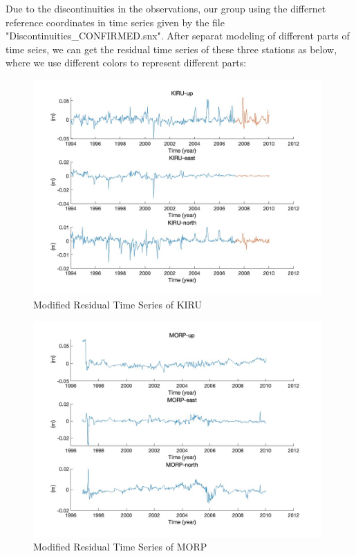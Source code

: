 \documentclass{article}
\begin{document}
Due to the discontinuities in the observations, our group using the differnet reference coordinates in time series given by the file "Discontinuities\_CONFIRMED.snx". 
After separat modeling of different parts of time seies, we can get the residual time series of these three stations as below, where we use different colors to represent different parts:
\begin{figure}[H]
  \centering
  \includegraphics[width=11cm]{../result/re_figure/fig_kiru/3.jpg}
  \captionsetup{skip=0.2cm}
  \caption{Modified Residual Time Series of KIRU}
  \label{fig:nRes_KIRU}
\end{figure}
\begin{figure}[H]
  \centering
  \includegraphics[width=11cm]{../result/re_figure/fig_MORP/3.jpg}
  \caption{Modified Residual Time Series of MORP}
  \label{fig:nRes_MORP}
\end{figure}
\end{document}
